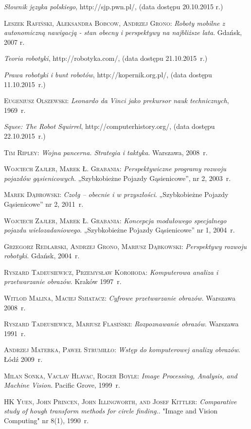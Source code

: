 \begin{thebibliography}{9}
\emph{Słownik języka polskiego}, http://sjp.pwn.pl/, (data dostępu 20.10.2015 r.)

\textsc{Leszek Rafiński, Aleksandra Bobcow, Andrzej Grono}: \emph{Roboty mobilne z autonomiczną nawigacją - stan obecny i perspektywy na najbliższe lata}. Gdańsk, 2007 r.  

\emph{Teoria robotyki}, http://robotyka.com/, (data dostępu 21.10.2015~r.)

\emph{Prawa robotyki i bunt robotów}, http://kopernik.org.pl/, (data dostępu 11.10.2015~r.)

\textsc{Eugeniusz Olszewski}: \emph{Leonardo da Vinci jako prekursor nauk technicznych}, 1969~r.

\emph{Squee: The Robot Squirrel}, http://computerhistory.org/, (data dostępu 22.10.2015~r.)

\textsc{Tim Ripley}: \emph{Wojna pancerna. Strategia i taktyka}. Warszawa, 2008~r.

\textsc{Wojciech Zajler, Marek Ł. Grabania}: \emph{Perspektywiczne programy rozwoju pojazdów gąsienicowych}. „Szybkobieżne Pojazdy Gąsienicowe”, nr 2, 2003~r.

\textsc{Marek Dąbrowski}: \emph{Czołg – obecnie i w przyszłości}. „Szybkobieżne Pojazdy Gąsienicowe” nr 2, 2011~r.

\textsc{Wojciech Zajler, Marek Ł. Grabania}: \emph{Koncepcja modułowego specjalnego pojazdu wielozadaniowego}. „Szybkobieżne Pojazdy Gąsienicowe” nr 1, 2004~r.

\textsc{Grzegorz Redlarski, Andrzej Grono, Mariusz Dąbkowski}: \emph{Perspektywy rozwoju robotyki}. Gdańsk, 2004~r.

\textsc{Ryszard Tadeusiewicz, Przemysław Korohoda}: \emph{Komputerowa analiza i przetwarzanie obrazów}. Kraków 1997~r.

\textsc{Witlod Malina, Maciej Smiatacz}: \emph{Cyfrowe przetwarzanie obrazów}. Warszawa 2008~r.

\textsc{Ryszard Tadeusiewicz, Mariusz Flasiński}: \emph{Rozpoznawanie obrazów}. Warszawa 1991~r.

\textsc{Andrzej Materka, Paweł Strumiłło}: \emph{Wstęp do komputerowej analizy obrazów}. Łódź 2009~r.

\textsc{Milan Sonka, Vaclav Hlavac, Roger Boyle}: \emph{Image Processing, Analysis, and Machine Vision}. Pacific Grove, 1999~r.

\textsc{HK Yuen, John Princen, John Illingworth, and Josef Kittler}: \emph{Comparative study of hough transform methods for circle finding.}. "Image and Vision Computing" nr 8(1), 1990~r.


\end{thebibliography}
